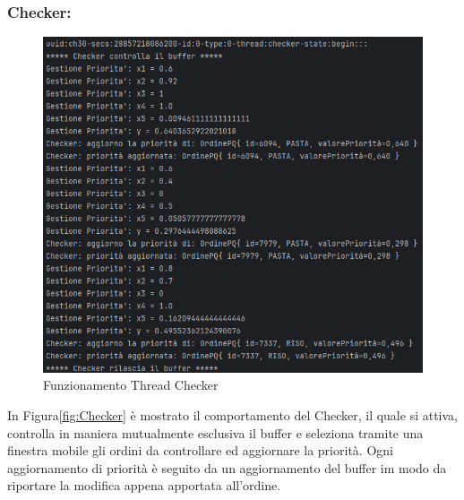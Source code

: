\subsubsection{Checker:}
\begin{figure}[H]
	\centering
	\includegraphics[scale=0.75]{iterazione3/images/Checker.png}
	\caption{Funzionamento Thread Checker \label{fig:Checker}}
\end{figure}
In Figura\vref{fig:Checker} è mostrato il comportamento del Checker, il quale si attiva, controlla in maniera mutualmente esclusiva il buffer e seleziona tramite una finestra mobile gli ordini da controllare ed aggiornare la priorità. Ogni aggiornamento di priorità è seguito da un aggiornamento del buffer im modo da riportare la modifica appena apportata all'ordine.
